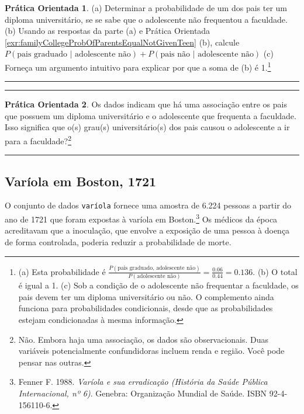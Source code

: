 \documentclass[
]{book}
\theoremstyle{definition}
\theoremstyle{definition}
\theoremstyle{definition}
\newtheorem{exercise}{Prática Orientada}[chapter]
\theoremstyle{definition}
\theoremstyle{remark}
\begin{document}
\begin{exercise}
\protect\hypertarget{exr:whyCondProbSumTo1}{}{\label{exr:whyCondProbSumTo1} }(a) Determinar a probabilidade de um dos pais ter um diploma universitário, se se sabe que o adolescente não frequentou a faculdade.
(b) Usando as respostas da parte (a) e Prática Orientada \ref{exr:familyCollegeProbOfParentsEqualNotGivenTeen} (b), calcule \(P(\text{pais graduado | adolescente não}) + P(\text{pais não | adolescente não})\)
(c) Forneça um argumento intuitivo para explicar por que a soma de (b) é 1.\footnote{(a) Esta probabilidade é \(\frac{P(\text{pais graduado, adolescente não})}{P(\text{adolescente não})} = \frac{0.06}{0.44} = 0.136\). (b) O total é igual a 1. (c) Sob a condição de o adolescente não frequentar a faculdade, os pais devem ter um diploma universitário ou não. O complemento ainda funciona para probabilidades condicionais, desde que as probabilidades estejam condicionadas à mesma informação.}
\end{exercise}

\begin{center}\rule{0.5\linewidth}{0.5pt}\end{center}

\begin{center}\rule{0.5\linewidth}{0.5pt}\end{center}

\begin{exercise}
\protect\hypertarget{exr:unnamed-chunk-59}{}{\label{exr:unnamed-chunk-59} }Os dados indicam que há uma associação entre os pais que possuem um diploma universitário e o adolescente que frequenta a faculdade. Isso significa que o(s) grau(s) universitário(s) dos pais causou o adolescente a ir para a faculdade?\footnote{Não. Embora haja uma associação, os dados são observacionais. Duas variáveis potencialmente confundidoras incluem renda e região. Você pode pensar nas outras.}
\end{exercise}

\begin{center}\rule{0.5\linewidth}{0.5pt}\end{center}

\hypertarget{boston1721}{%
\subsection{Varíola em Boston, 1721}\label{boston1721}}

O conjunto de dados \texttt{varíola} fornece uma amostra de 6.224 pessoas a partir do ano de 1721 que foram expostas à varíola em Boston.\footnote{Fenner F. 1988. \emph{Varíola e sua erradicação (História da Saúde Pública Internacional, nº 6)}. Genebra: Organização Mundial de Saúde. ISBN 92-4-156110-6.} Os médicos da época acreditavam que a inoculação, que envolve a exposição de uma pessoa à doença de forma controlada, poderia reduzir a probabilidade de morte.
\end{document}
